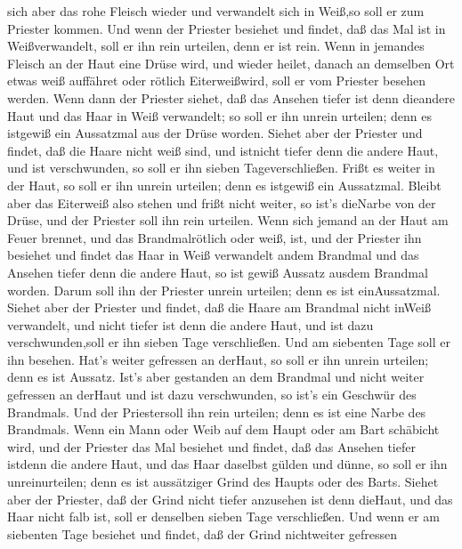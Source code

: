 sich aber das rohe Fleisch wieder und verwandelt sich in Weiß,so soll er
zum Priester kommen.  Und wenn der Priester besiehet und
findet, daß das Mal ist in Weißverwandelt, soll er ihn rein urteilen,
denn er ist rein.  Wenn in jemandes Fleisch an der Haut
eine Drüse wird, und wieder heilet,  danach an demselben
Ort etwas weiß auffähret oder rötlich Eiterweißwird, soll er vom
Priester besehen werden.  Wenn dann der Priester siehet,
daß das Ansehen tiefer ist denn dieandere Haut und das Haar in Weiß
verwandelt; so soll er ihn unrein urteilen; denn es istgewiß ein
Aussatzmal aus der Drüse worden.  Siehet aber der Priester
und findet, daß die Haare nicht weiß sind, und istnicht tiefer denn die
andere Haut, und ist verschwunden, so soll er ihn sieben
Tageverschließen.  Frißt es weiter in der Haut, so soll er
ihn unrein urteilen; denn es istgewiß ein Aussatzmal. 
Bleibt aber das Eiterweiß also stehen und frißt nicht weiter, so ist's
dieNarbe von der Drüse, und der Priester soll ihn rein urteilen.
 Wenn sich jemand an der Haut am Feuer brennet, und das
Brandmalrötlich oder weiß, ist,  und der Priester ihn
besiehet und findet das Haar in Weiß verwandelt andem Brandmal und das
Ansehen tiefer denn die andere Haut, so ist gewiß Aussatz ausdem
Brandmal worden. Darum soll ihn der Priester unrein urteilen; denn es
ist einAussatzmal.  Siehet aber der Priester und findet,
daß die Haare am Brandmal nicht inWeiß verwandelt, und nicht tiefer ist
denn die andere Haut, und ist dazu verschwunden,soll er ihn sieben Tage
verschließen.  Und am siebenten Tage soll er ihn besehen.
Hat's weiter gefressen an derHaut, so soll er ihn unrein urteilen; denn
es ist Aussatz.  Ist's aber gestanden an dem Brandmal und
nicht weiter gefressen an derHaut und ist dazu verschwunden, so ist's
ein Geschwür des Brandmals. Und der Priestersoll ihn rein urteilen; denn
es ist eine Narbe des Brandmals.  Wenn ein Mann oder Weib
auf dem Haupt oder am Bart schäbicht wird,  und der
Priester das Mal besiehet und findet, daß das Ansehen tiefer istdenn die
andere Haut, und das Haar daselbst gülden und dünne, so soll er ihn
unreinurteilen; denn es ist aussätziger Grind des Haupts oder des Barts.
 Siehet aber der Priester, daß der Grind nicht tiefer
anzusehen ist denn dieHaut, und das Haar nicht falb ist, soll er
denselben sieben Tage verschließen.  Und wenn er am
siebenten Tage besiehet und findet, daß der Grind nichtweiter gefressen
